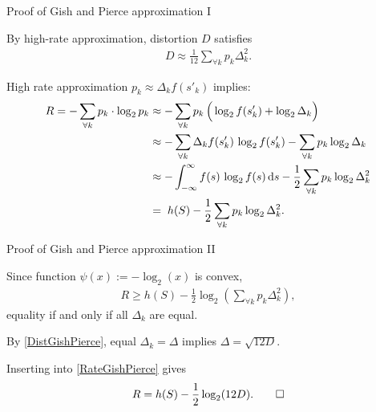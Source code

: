 \begin{frame}{Proof of Gish and Pierce approximation I}
\bit 
\item By high-rate approximation, distortion $D$ satisfies
\begin{align}\label{DistGishPierce}
D\approx \frac{1}{12}\sum_{\forall k}p_k\Delta_k^2.
\end{align}
\item High rate approximation $p_k\approx \Delta_k f(s'_k)$ implies:
\begin{align}\label{RateGishPierce} 
    R =
    -\sum_{\forall k}p_k\cdot\log_2p_k
    &\approx
    -\sum_{\forall k}p_k\,\Big(\log_2f(s'_k)+\log_2\Delta_k\Big)\nonumber
    \\    
    &\approx
    -\sum_{\forall k}\Delta_kf(s'_k)\,\log_2f(s'_k)-\sum_{\forall k}p_k\log_2\Delta_k\nonumber\\
    &\approx
    -\int_{-\infty}^{\infty}f(s)\,\log_2f(s)\,\mathrm{d} s-\frac{1}{2}\sum_{\forall k}p_k\log_2\Delta_k^2 \nonumber
    \\ &=\;
      h(S)-\frac{1}{2}\sum_{\forall k}p_k\log_2\Delta_k^2.
  \end{align}
\eit
\end{frame}
\begin{frame}{Proof of Gish and Pierce approximation II}\bit
\item Since function $\psi(x):=-\log_2(x)$ is convex, 
\begin{align*}
R\geq h(S)-\frac{1}{2}\log_2(\sum_{\forall k}p_k \Delta_k^2),
\end{align*}
equality if and only if all $\Delta_k$ are equal.
\item By \eqref{DistGishPierce}, equal $\Delta_k=\Delta$ implies $\Delta=\sqrt{12D}$.
\item Inserting into \eqref{RateGishPierce} gives
\begin{align}\label{DeltaGishPierce}
R=h(S)-\frac{1}{2}\log_2(12 D). \qed
\end{align}
\eit
\end{frame}







